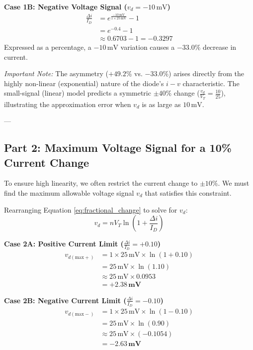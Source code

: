 \documentclass[12pt,a3paper]{article}
\begin{document}
\begin{enumerate}
\begin{tcolorbox}[enhanced,breakable,ansbox,colback=cA!4,colframe=cA,boxrule=0.8pt,arc=5pt,title={\textbf{Answer}},fonttitle=\bfseries\color{white},colbacktitle=cA]
\textbf{Case 1B: Negative Voltage Signal ($v_d = -10\,\text{mV}$)}
\begin{align}
    \frac{\Delta i}{I_D} &= e^{\frac{-10\,\text{mV}}{1 \times 25\,\text{mV}}} - 1 \\
    &= e^{-0.4} - 1 \\
    &\approx 0.6703 - 1 = -0.3297
\end{align}
Expressed as a percentage, a $-10\,\text{mV}$ variation causes a \textbf{$-33.0\%$} decrease in current.

\textit{Important Note:} The asymmetry ($+49.2\%$ vs. $-33.0\%$) arises directly from the highly non-linear (exponential) nature of the diode's $i-v$ characteristic. The small-signal (linear) model predicts a symmetric $\pm 40\%$ change ($\frac{v_d}{V_T} = \frac{10}{25}$), illustrating the approximation error when $v_d$ is as large as $10\,\text{mV}$.

---

\subsection*{Part 2: Maximum Voltage Signal for a 10\% Current Change}

To ensure high linearity, we often restrict the current change to $\pm 10\%$. We must find the maximum allowable voltage signal $v_d$ that satisfies this constraint.

Rearranging Equation \eqref{eq:fractional_change} to solve for $v_d$:
\begin{equation}
    v_d = n V_T \ln \left( 1 + \frac{\Delta i}{I_D} \right)
\end{equation}

\textbf{Case 2A: Positive Current Limit ($\frac{\Delta i}{I_D} = +0.10$)}
\begin{align}
    v_{d(\text{max}+)} &= 1 \times 25\,\text{mV} \times \ln(1 + 0.10) \\
    &= 25\,\text{mV} \times \ln(1.10) \\
    &\approx 25\,\text{mV} \times 0.0953 \\
    &= \mathbf{+2.38\,\text{mV}}
\end{align}

\textbf{Case 2B: Negative Current Limit ($\frac{\Delta i}{I_D} = -0.10$)}
\begin{align}
    v_{d(\text{max}-)} &= 1 \times 25\,\text{mV} \times \ln(1 - 0.10) \\
    &= 25\,\text{mV} \times \ln(0.90) \\
    &\approx 25\,\text{mV} \times (-0.1054) \\
    &= \mathbf{-2.63\,\text{mV}}
\end{align}


\end{tcolorbox}
\end{enumerate}
\end{document}
